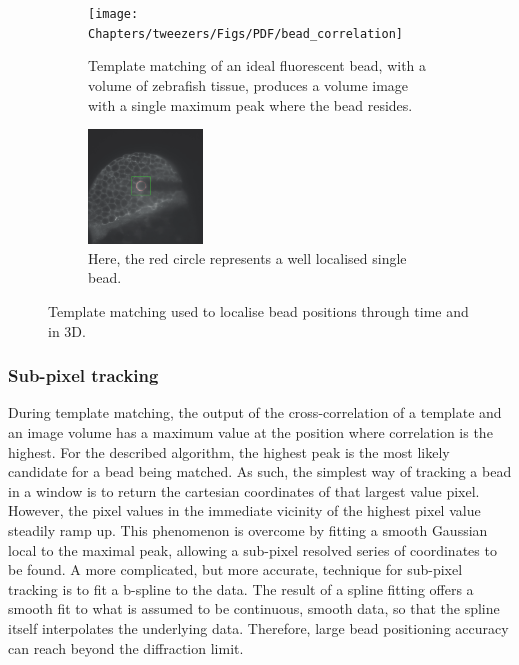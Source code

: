 \begin{figure}[t!]
 \centering
 \begin{subfigure}[t]{0.4\textwidth}
  \centering
  \texttt{[image: Chapters/tweezers/Figs/PDF/bead\_correlation]}
  \caption{
  Template matching of an ideal fluorescent bead, with a volume of \gls{zebrafish} tissue, produces a volume image with a single maximum peak where the bead resides.
  }
  \label{fig:bead_correlation}
 \end{subfigure}%
 \hspace{0.05\textwidth}
 \begin{subfigure}[t]{0.4\textwidth}
  \centering
  \includegraphics[height=1.2in]{Chapters/tweezers/Figs/PDF/bead_tracked}
  \caption{Here, the red circle represents a well localised single bead.}
  \label{fig:bead_tracked}
 \end{subfigure}
 \caption{Template matching used to localise bead positions through time and in 3D. }
\end{figure}

\subsubsection{Sub-pixel tracking}

During template matching, the output of the cross-correlation of a template and an image volume has a maximum value at the position where correlation is the highest.
For the described algorithm, the highest peak is the most likely candidate for a bead being matched.
As such, the simplest way of tracking a bead in a window is to return the cartesian coordinates of that largest value pixel.
However, the pixel values in the immediate vicinity of the highest pixel value steadily ramp up.
This phenomenon is overcome by fitting a smooth Gaussian local to the maximal peak, allowing a sub-pixel resolved series of coordinates to be found.
A more complicated, but more accurate, technique for sub-pixel tracking is to fit a b-spline to the data.
The result of a spline fitting offers a smooth fit to what is assumed to be continuous, smooth data, so that the spline itself interpolates the underlying data. Therefore, large bead positioning accuracy can reach beyond the diffraction limit.

